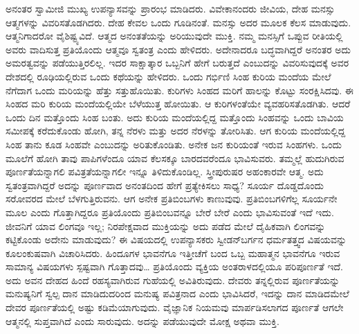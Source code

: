 ಅನಂತರ ಸ್ವಾಮೀಜಿ ಮುಖ್ಯ ಉಪನ್ಯಾಸವನ್ನು ಪ್ರಾರಂಭ ಮಾಡಿದರು. ವಿವೇಕಾನಂದರು ಜೀವಿಯ, ದೇಹ ಮನಸ್ಸು ಆತ್ಮಗಳನ್ನು ವಿವರಿಸತೊಡಗಿದರು. ದೇಹ ಕೇವಲ ಒಂದು ಗೂಡಿನಂತೆ. ಮನಸ್ಸು ಅದರ ಮೂಲಕ ಕೆಲಸ ಮಾಡುವುದು. ಆತ್ಮನಿಗಾದರೋ ವೈಶಿಷ್ಟ್ಯವಿದೆ. ಆತ್ಮದ ಅನಂತತೆಯನ್ನು ಅರಿಯುವುದೇ ಮುಕ್ತಿ. ನಮ್ಮ ಮನಸ್ಸಿಗೆ ಒಪ್ಪುವ ರೀತಿಯಲ್ಲಿ ಅವರು ವಾದಿಸುತ್ತ ಪ್ರತಿಯೊಂದು ಆತ್ಮವೂ ಸ್ವತಂತ್ರ ಎಂದು ಹೇಳಿದರು. ಅದೇನಾದರೂ ಬದ್ಧವಾಗಿದ್ದರೆ ಅನಂತರ ಅದು ಅಮರತ್ವವನ್ನು ಪಡೆಯುತ್ತಿರಲಿಲ್ಲ. ಇದರ ಸಾಕ್ಷಾತ್ಕಾರ ಒಬ್ಬನಿಗೆ ಹೇಗೆ ಬರುತ್ತದೆ ಎಂಬುದನ್ನು ವಿವರಿಸುವುದಕ್ಕೆ ಅವರ ದೇಶದಲ್ಲಿ ರೂಢಿಯಲ್ಲಿರುವ ಒಂದು ಕಥೆಯನ್ನು ಹೇಳಿದರು. ಒಂದು ಗರ್ಭಿಣಿ ಸಿಂಹ ಕುರಿಯ ಮಂದೆಯ ಮೇಲೆ ನೆಗೆದಾಗ ಒಂದು ಮರಿಯನ್ನು ಹೆತ್ತು ಸತ್ತುಹೊಯಿತು. ಕುರಿಗಳು ಸಿಂಹದ ಮರಿಗೆ ಹಾಲನ್ನು ಕೊಟ್ಟು ಸಂರಕ್ಷಿಸಿದವು. ಈ ಸಿಂಹದ ಮರಿ ಕುರಿಯ ಮಂದೆಯಲ್ಲಿಯೇ ಬೆಳೆಯುತ್ತ ಹೋಯಿತು. ಆ ಕುರಿಗಳಂತೆಯೇ ವ್ಯವಹರಿಸತೊಡಗಿತು. ಆದರೆ ಒಂದು ದಿನ ಮತ್ತೊಂದು ಸಿಂಹ ಬಂತು. ಅದು ಕುರಿಯ ಮಂದೆಯಲ್ಲಿದ್ದ ಮತ್ತೊಂದು ಸಿಂಹವನ್ನು ಒಂದು ಬಾವಿಯ ಸಮೀಪಕ್ಕೆ ಕರೆದುಕೊಂಡು ಹೋಗಿ, ತನ್ನ ನೆರಳು ಮತ್ತು ಅದರ ನೆರಳನ್ನು ತೋರಿಸಿತು. ಆಗ ಕುರಿಯ ಮಂದೆಯಲ್ಲಿದ್ದ ಸಿಂಹ ತಾನು ಕೂಡ ಸಿಂಹವೇ ಎಂಬುದನ್ನು ಅರಿತುಕೊಂಡಿತು. ಅನೇಕ ಜನ ಕುರಿಯಂತೆ ಇರುವ ಸಿಂಹಗಳು. ಒಂದು ಮೂಲೆಗೆ ಹೋಗಿ ತಾವು ಪಾಪಿಗಳೆಂದೂ ಯಾವ ಕೆಲಸಕ್ಕೂ ಬಾರದವರೆಂದೂ ಭಾವಿಸುವರು. ತಮ್ಮಲ್ಲೆ ಹುದುಗಿರುವ ಪೂರ್ಣತೆಯನ್ನಾಗಲಿ ಪವಿತ್ರತೆಯನ್ನಾಗಲೀ ಇನ್ನೂ ತಿಳಿದುಕೊಂಡಿಲ್ಲ. ಸ್ತ್ರೀಪುರುಷರ ಅಹಂಕಾರವೇ ಆತ್ಮ. ಅದು ಸ್ವತಂತ್ರವಾಗಿದ್ದರೆ ಅದನ್ನು ಪೂರ್ಣವಾದ ಅನಂತದಿಂದ ಹೇಗೆ ಪ್ರತ್ಯೇಕಿಸಲು ಸಾಧ್ಯ? ಸೂರ್ಯ ದೊಡ್ಡದೊಂದು ಸರೋವರದ ಮೇಲೆ ಬೆಳಗುತ್ತಿರುವನು. ಆಗ ಅನೇಕ ಪ್ರತಿಬಿಂಬಗಳು ಕಾಣುವುವು. ಪ್ರತಿಬಿಂಬಗಳಿಗೆಲ್ಲ ಸೂರ್ಯನೇ ಮೂಲ ಎಂದು ಗೊತ್ತಾಗಿದ್ದರೂ ಪ್ರತಿಯೊಂದು ಪ್ರತಿಬಿಂಬವನ್ನೂ ಬೇರೆ ಬೇರೆ ಎಂದು ಭಾವಿಸುವಂತೆ ಇದೆ ಇದು. ಜೀವನಿಗೆ ಯಾವ ಲಿಂಗವೂ ಇಲ್ಲ; ನಿರಪೇಕ್ಷವಾದ ಮುಕ್ತಿಯನ್ನು ಅದು ಪಡೆದ ಮೇಲೆ ದೈಹಿಕವಾಗಿ ಲಿಂಗವನ್ನು ಕಟ್ಟಿಕೊಂಡು ಅದೇನು ಮಾಡುವುದು? ಈ ವಿಷಯದಲ್ಲಿ ಉಪನ್ಯಾಸಕರು ಸ್ವೀಡನ್‍ಬರ್ಗನ ಧರ್ಮತತ್ತ್ವದ ವಿಷಯವನ್ನು ಕೂಲಂಕುಷವಾಗಿ ವಿಚಾರಿಸಿದರು. ಹಿಂದೂಗಳ ಭಾವನೆಗೂ ಇತ್ತೀಚೆಗೆ ಬಂದ ಒಬ್ಬ ಮಹಾತ್ಮನ ಭಾವನೆಗೂ ಇರುವ ಸಾಮಾನ್ಯ ವಿಷಯಗಳು ಸ್ಪಷ್ಟವಾಗಿ ಗೊತ್ತಾದವು… ಪ್ರತಿಯೊಂದು ವ್ಯಕ್ತಿಯ ಅಂತರಾಳದಲ್ಲಿಯೂ ಪರಿಪೂರ್ಣತೆ ಇದೆ. ಅದು ಅವನ ದೇಹದ ಹಿಂದೆ ರಹಸ್ಯವಾಗಿರುವ ಗುಹೆಯಲ್ಲಿ ಅವಿತಿರುವುದು. ದೇವರು ತನ್ನಲ್ಲಿರುವ ಪೂರ್ಣತೆಯನ್ನು ಮನುಷ್ಯನಿಗೆ ಸ್ವಲ್ಪ ದಾನ ಮಾಡಿದುದರಿಂದ ಮನುಷ್ಯ ಪವಿತ್ರನಾದ ಎಂದು ಭಾವಿಸಿದರೆ, ಇದನ್ನು ದಾನ ಮಾಡಿದಮೇಲೆ ದೇವರ ಪೂರ್ಣತೆಯಲ್ಲಿ ಅಷ್ಟು ಕಡಿಮೆಯಾಗುವುದು. ವೈಜ್ಞಾನಿಕ ನಿಯಮವು ಮಾರ್ಪಡಿಸಲಾಗದ ಪೂರ್ಣತೆ ಆಗಲೇ ಆತ್ಮನಲ್ಲಿ ಸುಪ್ತವಾಗಿದೆ ಎಂದು ಸಾರುವುದು. ಅದನ್ನು ಪಡೆಯುವುದೇ ಮೋಕ್ಷ ಅಥವಾ ಮುಕ್ತಿ. 

